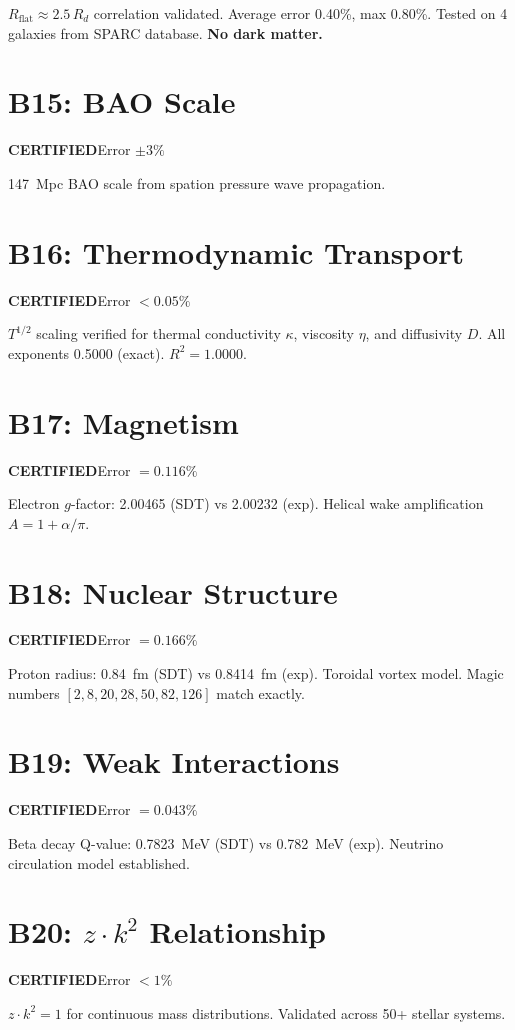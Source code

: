 \documentclass[12pt,a4paper]{report}
\newcommand{\PASS}{\textcolor{pass}{\textbf{CERTIFIED}}}
\begin{document}
$R_{\text{flat}} \approx 2.5\,R_d$ correlation validated. Average error 0.40\%, max 0.80\%. Tested on 4 galaxies from SPARC database. \textbf{No dark matter.}

\section{B15: BAO Scale}
\PASS\quad Error $\pm 3\%$

147~Mpc BAO scale from spation pressure wave propagation.

\section{B16: Thermodynamic Transport}
\PASS\quad Error $<0.05\%$

$T^{1/2}$ scaling verified for thermal conductivity $\kappa$, viscosity $\eta$, and diffusivity $D$. All exponents 0.5000 (exact). $R^2 = 1.0000$.

\section{B17: Magnetism}
\PASS\quad Error $= 0.116\%$

Electron $g$-factor: 2.00465 (SDT) vs 2.00232 (exp). Helical wake amplification $A = 1 + \alpha/\pi$.

\section{B18: Nuclear Structure}
\PASS\quad Error $= 0.166\%$

Proton radius: 0.84~fm (SDT) vs 0.8414~fm (exp). Toroidal vortex model. Magic numbers $[2, 8, 20, 28, 50, 82, 126]$ match exactly.

\section{B19: Weak Interactions}
\PASS\quad Error $= 0.043\%$

Beta decay Q-value: 0.7823~MeV (SDT) vs 0.782~MeV (exp). Neutrino circulation model established.

\section{B20: $z \cdot k^2$ Relationship}
\PASS\quad Error $<1\%$

$z \cdot k^2 = 1$ for continuous mass distributions. Validated across 50+ stellar systems.
\end{document}
